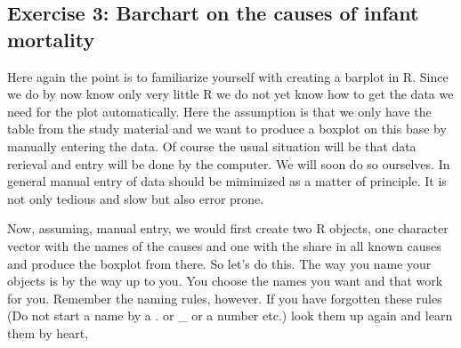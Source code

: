 \documentclass[letterpaper,10pt,english]{jupyterBook}
\begin{document}
\subsection{Exercise 3: Barchart on the causes of infant mortality}
\label{\detokenize{exercises_unit_1:exercise-3-barchart-on-the-causes-of-infant-mortality}}
\sphinxAtStartPar
Here again the point is to familiarize yourself with creating a barplot in R. Since we do by now know only very little R we do not yet know how to get the data we need for the plot automatically. Here the assumption is that we only have the table from the study material and we want to produce a boxplot on this base by manually entering the data. Of course the usual situation will be that data rerieval and entry will be done by the computer. We will soon do so ourselves. In general manual entry of data should be mimimized as a matter of principle. It is not only tedious and slow but also error prone.

\sphinxAtStartPar
Now, assuming, manual entry, we would first create two R objects, one character vector with the names of the causes and one with the share in all known causes and produce the boxplot from there. So let’s do this. The way you name your objects is by the way up to you. You choose the names you want and that work for you. Remember the naming rules, however. If you have forgotten these rules (Do not start a name by a . or \_ or a number etc.) look them up again and learn them by heart,
\end{document}
